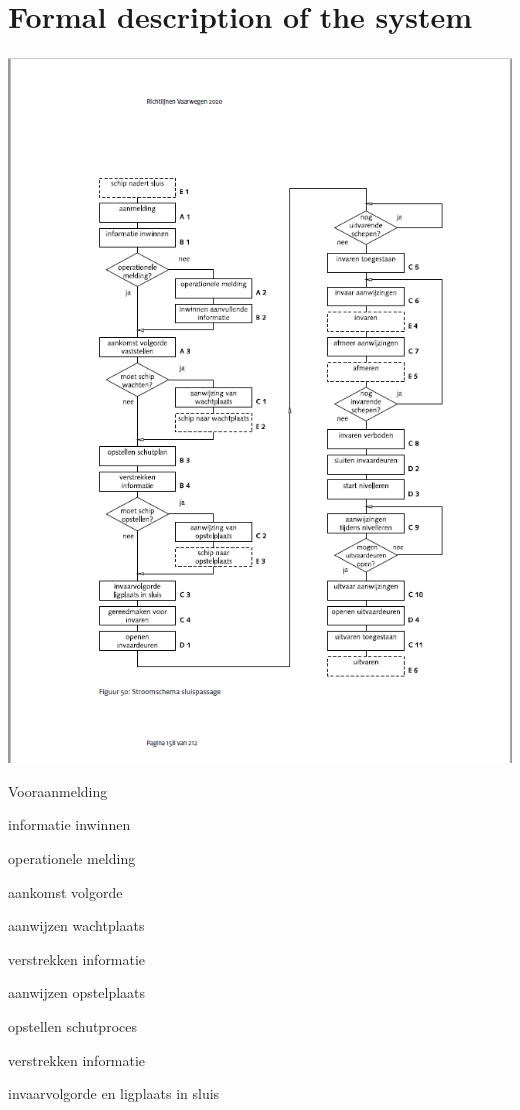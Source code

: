 {{{{{{{{{\begin{itemize}
\end{itemize}

\chapter{Formal description of the system}

\includegraphics[scale=0.65]{sluispassage.png}


\begin{itemize}
\begin{minipage}{0.4\linewidth}
\item Vooraanmelding
\item informatie inwinnen
\item operationele melding
\item aankomst volgorde
\item aanwijzen wachtplaats
\item verstrekken informatie
\item aanwijzen opstelplaats
\item opstellen schutproces
\item verstrekken informatie
\item invaarvolgorde en ligplaats in sluis


\end{minipage}
\end{itemize}}}}}}}}}}
